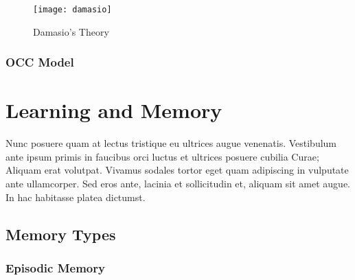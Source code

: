 \begin{figure}[]
\centering
	\texttt{[image: damasio]}
    \caption{Damasio's Theory}
\label{fig:damasio}
\end{figure}



\subsubsection{OCC Model}

\section{Learning and Memory}

Nunc posuere quam at lectus tristique eu ultrices augue venenatis. Vestibulum ante ipsum primis in faucibus orci luctus et ultrices posuere cubilia Curae; Aliquam erat volutpat. Vivamus sodales tortor eget quam adipiscing in vulputate ante ullamcorper. Sed eros ante, lacinia et sollicitudin et, aliquam sit amet augue. In hac habitasse platea dictumst.


\subsection{Memory Types}


\subsubsection{Episodic Memory}




